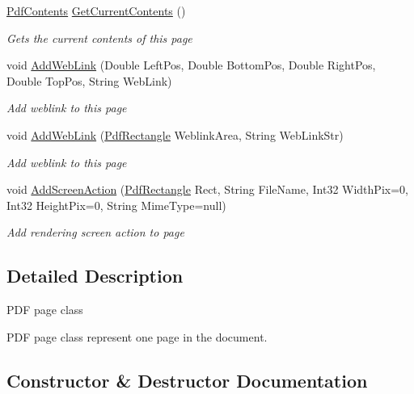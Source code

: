 \begin{DoxyCompactItemize}
\hyperlink{class_pdf_file_writer_1_1_pdf_contents}{Pdf\+Contents} \hyperlink{class_pdf_file_writer_1_1_pdf_page_a2026859d1078fc9b0db7ecbee51c19b6}{Get\+Current\+Contents} ()
\begin{DoxyCompactList}\small\item\em Gets the current contents of this page \end{DoxyCompactList}\item 
void \hyperlink{class_pdf_file_writer_1_1_pdf_page_a6da394f2ddba2f0e1079034f33a579b7}{Add\+Web\+Link} (Double Left\+Pos, Double Bottom\+Pos, Double Right\+Pos, Double Top\+Pos, String Web\+Link)
\begin{DoxyCompactList}\small\item\em Add weblink to this page \end{DoxyCompactList}\item 
void \hyperlink{class_pdf_file_writer_1_1_pdf_page_a0e4965aa744e389ca73c4c7f56f7dfaa}{Add\+Web\+Link} (\hyperlink{class_pdf_file_writer_1_1_pdf_rectangle}{Pdf\+Rectangle} Weblink\+Area, String Web\+Link\+Str)
\begin{DoxyCompactList}\small\item\em Add weblink to this page \end{DoxyCompactList}\item 
void \hyperlink{class_pdf_file_writer_1_1_pdf_page_a297ae1562ea479b08c4957a54b1cc485}{Add\+Screen\+Action} (\hyperlink{class_pdf_file_writer_1_1_pdf_rectangle}{Pdf\+Rectangle} Rect, String File\+Name, Int32 Width\+Pix=0, Int32 Height\+Pix=0, String Mime\+Type=null)
\begin{DoxyCompactList}\small\item\em Add rendering screen action to page \end{DoxyCompactList}\end{DoxyCompactItemize}


\subsection{Detailed Description}
P\+DF page class 

P\+DF page class represent one page in the document. 

\subsection{Constructor \& Destructor Documentation}
